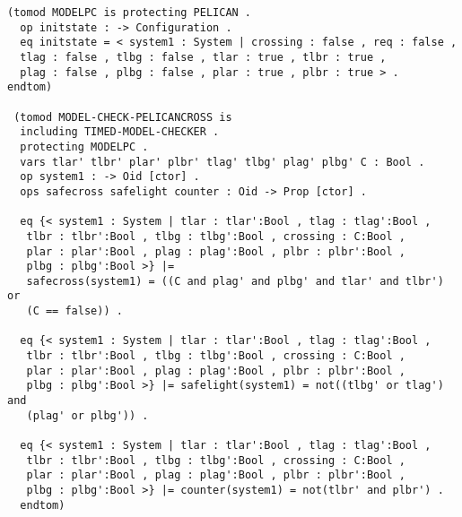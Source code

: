\documentclass[a4paper,11pt]{report}
\begin{document}
\begin{verbatim}
(tomod MODELPC is protecting PELICAN .
  op initstate : -> Configuration .
  eq initstate = < system1 : System | crossing : false , req : false , 
  tlag : false , tlbg : false , tlar : true , tlbr : true , 
  plag : false , plbg : false , plar : true , plbr : true > .
endtom)

 (tomod MODEL-CHECK-PELICANCROSS is 
  including TIMED-MODEL-CHECKER .
  protecting MODELPC .
  vars tlar' tlbr' plar' plbr' tlag' tlbg' plag' plbg' C : Bool .
  op system1 : -> Oid [ctor] .
  ops safecross safelight counter : Oid -> Prop [ctor] .

  eq {< system1 : System | tlar : tlar':Bool , tlag : tlag':Bool ,
   tlbr : tlbr':Bool , tlbg : tlbg':Bool , crossing : C:Bool , 
   plar : plar':Bool , plag : plag':Bool , plbr : plbr':Bool ,
   plbg : plbg':Bool >} |= 
   safecross(system1) = ((C and plag' and plbg' and tlar' and tlbr') or 
   (C == false)) .

  eq {< system1 : System | tlar : tlar':Bool , tlag : tlag':Bool ,
   tlbr : tlbr':Bool , tlbg : tlbg':Bool , crossing : C:Bool , 
   plar : plar':Bool , plag : plag':Bool , plbr : plbr':Bool , 
   plbg : plbg':Bool >} |= safelight(system1) = not((tlbg' or tlag') and 
   (plag' or plbg')) .

  eq {< system1 : System | tlar : tlar':Bool , tlag : tlag':Bool ,
   tlbr : tlbr':Bool , tlbg : tlbg':Bool , crossing : C:Bool , 
   plar : plar':Bool , plag : plag':Bool , plbr : plbr':Bool , 
   plbg : plbg':Bool >} |= counter(system1) = not(tlbr' and plbr') .
  endtom)
\end{verbatim}
\end{document}
